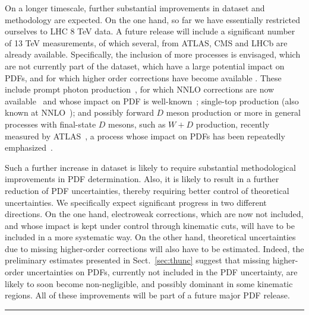 On a longer timescale, further substantial improvements in dataset and
methodology are expected.
On the one hand, so far we have essentially  
restricted ourselves to LHC 8 TeV data.
A future release will include a significant
number of 13 TeV measurements, of which several,
from ATLAS, CMS and LHCb are already available. Specifically, the
inclusion of more processes is envisaged,
which are not currently part of the
dataset, which have a large potential impact on PDFs, and for which higher order corrections have become
available . These include prompt photon
production~\cite{Aaboud:2017cbm}, for which 
NNLO corrections are now available~\cite{Campbell:2016lzl}  and whose
impact on PDF is 
well-known~\cite{d'Enterria:2012yj};  single-top production
(also known at NNLO~\cite{Brucherseifer:2014ama});  and possibly forward  
$D$ meson production or more in general processes with final-state $D$
mesons, such as $W+D$ production, recently measured by
ATLAS~\cite{Aad:2014xca}, a process whose impact on PDFs has been
repeatedly emphasized~\cite{Zenaiev:2015rfa,Gauld:2015yia,Gauld:2016kpd}.

Such a further increase in dataset is likely to require substantial
methodological improvements in PDF determination. Also, it is likely
to result in a further reduction of PDF uncertainties, thereby
requiring better control of theoretical uncertainties. We
specifically expect significant progress in two different
directions. On the one hand, electroweak corrections, which are now
not included, and whose impact is kept under control through kinematic
cuts, will have to be included in a more systematic way. On the other hand,
theoretical uncertainties due to missing higher-order corrections 
will also have to be estimated. Indeed, the preliminary estimates presented in
Sect.~\ref{sec:thunc} suggest that missing higher-order uncertainties
on PDFs, currently not included in the PDF uncertainty, 
are likely to soon become non-negligible, and possibly dominant in
some kinematic regions. All of these improvements will be part of a future
major PDF release. 

\bigskip
\bigskip
\begin{center}
\rule{5cm}{.1pt}
\end{center}
\bigskip
\bigskip

